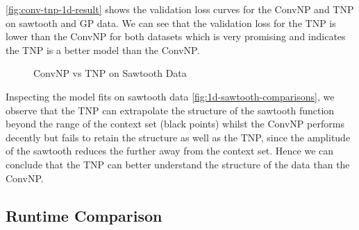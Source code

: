 \documentclass[../../main.tex]{subfiles}
\begin{document}
\autoref{fig:conv-tnp-1d-result} shows the validation loss curves for the ConvNP and TNP on sawtooth and GP data. We can see that the validation loss for the TNP is lower than the ConvNP for both datasets which is very promising and indicates the TNP is a better model than the ConvNP. 


\begin{figure}[H]
	\centering
	\qquad
	\caption{ConvNP vs TNP on Sawtooth Data}
	\label{fig:1d-sawtooth-comparisons}
\end{figure}

Inspecting the model fits on sawtooth data \autoref{fig:1d-sawtooth-comparisons}, we observe that the TNP can extrapolate the structure of the sawtooth function beyond the range of the context set (black points) whilst the ConvNP performs decently but fails to retain the structure as well as the TNP, since the amplitude of the sawtooth reduces the further away from the context set. Hence we can conclude that the TNP can better understand the structure of the data than the ConvNP.

\subsection{Runtime Comparison}




\ifSubfilesClassLoaded{%
    \printbibliography{}
}{} 
\end{document}
